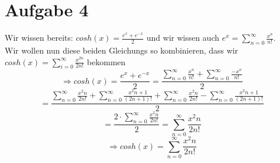 \section{Aufgabe 4}
Wir wissen bereits: $cosh(x) = \frac{e^x+e^{-x}}{2}$ und wir wissen auch $ e^x = \sum_{n=0}^{\infty}\frac{x^n}{n!}$. \\
Wir wollen nun diese beiden Gleichungs so kombinieren, dass wir $cosh(x) = \sum_{i=0}^{\infty} \frac{x^{2n}}{2n!} $ bekommen
$$\Rightarrow 
cosh(x) = \frac{e^x+e^{-x}}{2} 
= \frac{\sum_{n=0}^{\infty}\frac{x^n}{n!} + \sum_{n=0}^{\infty}\frac{-x^n}{n!}}{2} 
$$
$$
= \frac{\sum_{n=0}^{\infty}\frac{x^2n}{2n!} + \sum_{n=0}^{\infty}\frac{x^2n+1}{(2n+1)!} + \sum_{n=0}^{\infty}\frac{x^2n}{2n!} - \sum_{n=0}^{\infty}\frac{x^2n+1}{(2n+1)!}}{2}
$$
$$= \frac{2 \cdot \sum_{n=0}^{\infty}\frac{x^2n}{2n!} }{2} = \sum_{n=0}^{\infty}\frac{x^2n}{2n!}$$
$$\Rightarrow cosh(x) = \sum_{n=0}^{\infty}\frac{x^2n}{2n!}$$